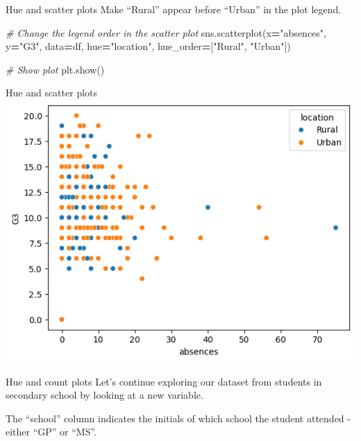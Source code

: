 \documentclass[
  ignorenonframetext,
]{beamer}
\newenvironment{Shaded}{\begin{snugshade}}{\end{snugshade}}
\newcommand{\CommentTok}[1]{\textcolor[rgb]{0.56,0.35,0.01}{\textit{#1}}}
\newcommand{\NormalTok}[1]{#1}
\newcommand{\OperatorTok}[1]{\textcolor[rgb]{0.81,0.36,0.00}{\textbf{#1}}}
\newcommand{\StringTok}[1]{\textcolor[rgb]{0.31,0.60,0.02}{#1}}
\begin{document}
\begin{frame}[fragile]{Hue and scatter plots}
\label{hue-and-scatter-plots-4}
Make ``Rural'' appear before ``Urban'' in the plot legend.


\begin{Shaded}
\begin{Highlighting}[]
\CommentTok{\# Change the legend order in the scatter plot}
\NormalTok{ sns.scatterplot(x}\OperatorTok{=}\StringTok{"absences"}\NormalTok{, y}\OperatorTok{=}\StringTok{"G3"}\NormalTok{, }
\NormalTok{                data}\OperatorTok{=}\NormalTok{df, }
\NormalTok{                hue}\OperatorTok{=}\StringTok{"location"}\NormalTok{,}
\NormalTok{                hue\_order}\OperatorTok{=}\NormalTok{[}\StringTok{"Rural"}\NormalTok{, }\StringTok{"Urban"}\NormalTok{])}

\CommentTok{\# Show plot}
\NormalTok{plt.show()}
\end{Highlighting}
\end{Shaded}
\end{frame}

\begin{frame}{Hue and scatter plots}
\label{hue-and-scatter-plots-5}
\includegraphics{../images/im260.png}
\end{frame}

\begin{frame}{Hue and count plots}
\label{hue-and-count-plots}
Let's continue exploring our dataset from students in secondary school
by looking at a new variable.

The ``school'' column indicates the initials of which school the student
attended - either ``GP'' or ``MS''.
\end{frame}
\end{document}
